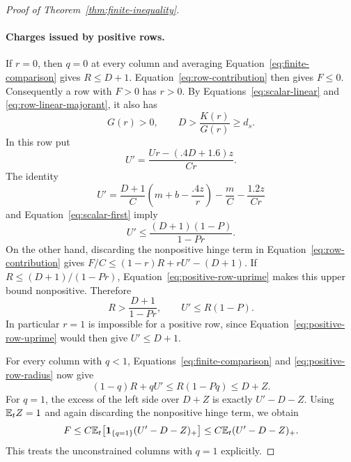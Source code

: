 \begin{proof}[Proof of Theorem~\ref{thm:finite-inequality}]
\paragraph{Charges issued by positive rows.}
If $r=0$, then $q=0$ at every column and averaging
Equation~\eqref{eq:finite-comparison} gives $R\le D+1$.
Equation~\eqref{eq:row-contribution} then gives $F\le0$.
Consequently a row with $F>0$ has $r>0$.  By
Equations~\eqref{eq:scalar-linear} and
\eqref{eq:row-linear-majorant}, it also has
\begin{equation}
\label{eq:positive-row-location}
 G(r)>0,\qquad D>\frac{K(r)}{G(r)}\ge d_s.
\end{equation}
In this row put
\[
 U'=\frac{Ur-(.4D+1.6)z}{Cr}.
\]
The identity
\[
 U'=\frac{D+1}{C}\left(m+b-\frac{.4z}{r}\right)
       -\frac mC-\frac{1.2z}{Cr}
\]
and Equation~\eqref{eq:scalar-first} imply
\begin{equation}
\label{eq:positive-row-uprime}
 U'\le\frac{(D+1)(1-P)}{1-Pr}.
\end{equation}
On the other hand, discarding the nonpositive hinge term in
Equation~\eqref{eq:row-contribution} gives
$F/C\le(1-r)R+rU'-(D+1)$.
If $R\le(D+1)/(1-Pr)$, Equation~\eqref{eq:positive-row-uprime}
makes this upper bound nonpositive.  Therefore
\begin{equation}
\label{eq:positive-row-radius}
 R>\frac{D+1}{1-Pr},\qquad U'\le R(1-P).
\end{equation}
In particular $r=1$ is impossible for a positive row, since
Equation~\eqref{eq:positive-row-uprime} would then give $U'\le D+1$.

For every column with $q<1$, Equations~\eqref{eq:finite-comparison}
and \eqref{eq:positive-row-radius} now give
\[
 (1-q)R+qU'\le R(1-Pq)\le D+Z.
\]
For $q=1$, the excess of the left side over $D+Z$ is exactly
$U'-D-Z$.  Using $\mathbb E_tZ=1$ and again discarding the nonpositive
hinge term, we obtain
\begin{equation}
\label{eq:positive-row-excess}
 F\le C\mathbb E_t\big[\mathbf 1_{\{q=1\}}(U'-D-Z)_+\big]
   \le C\mathbb E_t(U'-D-Z)_+.
\end{equation}
This treats the unconstrained columns with $q=1$ explicitly.


\end{proof}

